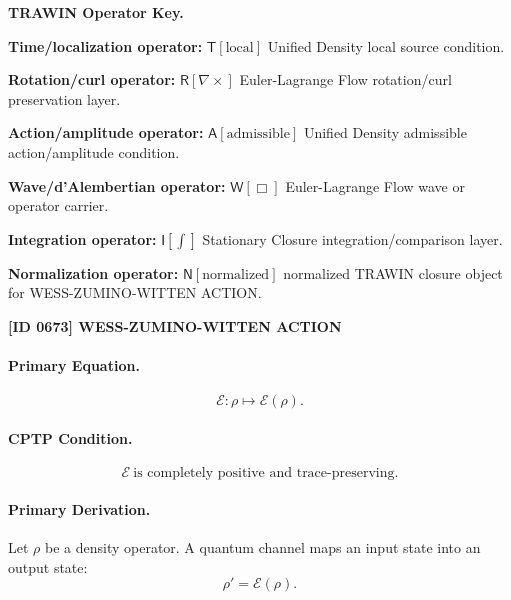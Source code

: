 \par\vspace{0.45\baselineskip}
\noindent\begin{minipage}[t]{\linewidth}
\begingroup
\small
\raggedright
\textbf{TRAWIN Operator Key.}\par
\noindent\textbf{Time/localization operator:} $\mathsf{T}\!\left[\mathrm{local}\right]$ Unified Density local source condition.\par
\noindent\textbf{Rotation/curl operator:} $\mathsf{R}\!\left[\nabla\times\right]$ Euler-Lagrange Flow rotation/curl preservation layer.\par
\noindent\textbf{Action/amplitude operator:} $\mathsf{A}\!\left[\mathrm{admissible}\right]$ Unified Density admissible action/amplitude condition.\par
\noindent\textbf{Wave/d'Alembertian operator:} $\mathsf{W}\!\left[\Box\right]$ Euler-Lagrange Flow wave or operator carrier.\par
\noindent\textbf{Integration operator:} $\mathsf{I}\!\left[\int\right]$ Stationary Closure integration/comparison layer.\par
\noindent\textbf{Normalization operator:} $\mathsf{N}\!\left[\mathrm{normalized}\right]$ normalized TRAWIN closure object for WESS-ZUMINO-WITTEN ACTION.\par
\endgroup
\end{minipage}

\clearpage
\noindent\textbf{[ID 0673] WESS-ZUMINO-WITTEN ACTION}\par
\vspace{0.35em}
\paragraph{Primary Equation.}
\begin{equation}
\mathcal{E}:\rho\mapsto \mathcal{E}(\rho).
\end{equation}

\paragraph{CPTP Condition.}
\begin{equation}
\mathcal{E}\ \text{is completely positive and trace-preserving}.
\end{equation}

\paragraph{Primary Derivation.}
Let $\rho$ be a density operator. A quantum channel maps an input state into an output state:
\begin{equation}
\rho'=\mathcal{E}(\rho).
\end{equation}

